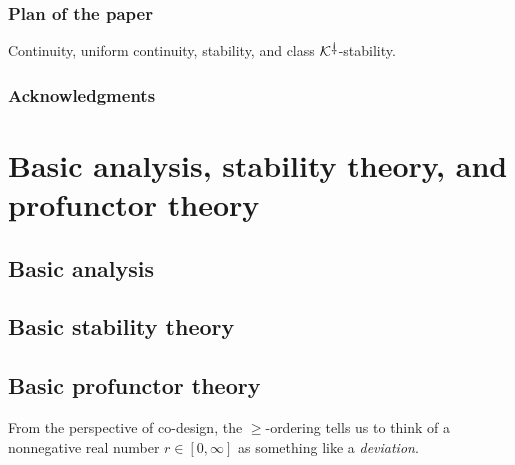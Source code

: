 \documentclass[11pt, one side, article]{memoir}
\theoremstyle{definition}
\theoremstyle{plain}
\newcommand{\cat}[1]{\mathcal{#1}}%
\newcommand{\ldag}{^{\rotatebox{180}{$\dagger$}}}
\newcommand{\K}{\cat{K}}
\newcommand{\Kdag}[1][0]{\K\ldag}
\begin{document}
\subsection{Plan of the paper}

Continuity, 
uniform continuity, 
stability, and
class $\Kdag$-stability.

\subsection*{Acknowledgments}



\chapter{Basic analysis, stability theory, and profunctor theory}
\label{chap.stability_and_profunctors}


\section{Basic analysis}



\section{Basic stability theory}

\section{Basic profunctor theory}


From the perspective of co-design, the $\geq$-ordering tells us to think of a nonnegative real number $r\in[0,\infty]$ as something like a \emph{deviation}.
\end{document}
